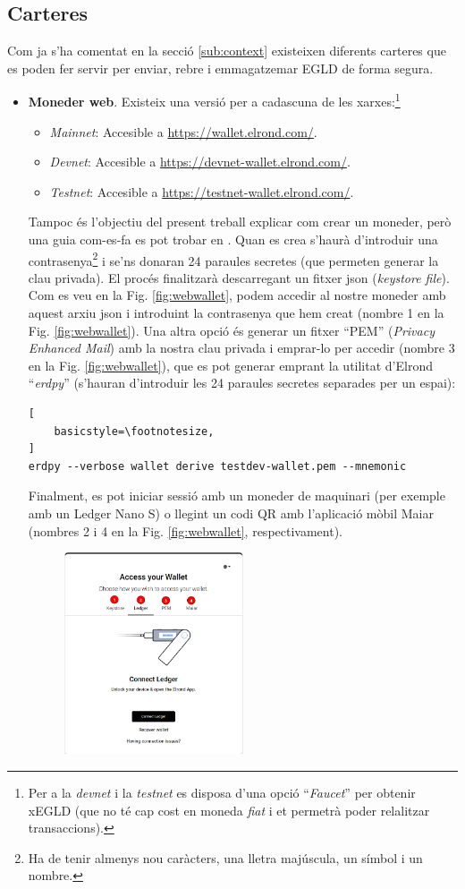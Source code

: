 \documentclass[11pt,a4paper]{article}
\begin{document}
\subsection{Carteres}
Com ja s'ha comentat en la secció \ref{sub:context} existeixen diferents carteres que es poden fer servir per enviar, rebre i emmagatzemar EGLD de forma segura.
\begin{itemize}
\item \textbf{Moneder web}. Existeix una versió per a cadascuna de les xarxes:\footnote{Per a la \textit{devnet} i la \textit{testnet} es disposa d'una opció ``\textit{Faucet}'' per obtenir xEGLD (que no té cap cost en moneda \textit{fiat} i et permetrà poder relalitzar transaccions).}
	\begin{itemize}
	\item \textit{Mainnet}: Accesible a \url{https://wallet.elrond.com/}.
	\item \textit{Devnet}: Accesible a \url{https://devnet-wallet.elrond.com/}.
	\item \textit{Testnet}: Accesible a \url{https://testnet-wallet.elrond.com/}.
	\end{itemize}
Tampoc és l'objectiu del present treball explicar com crear un moneder, però una guia com-es-fa es pot trobar en \cite{elrond2022}. Quan es crea s'haurà d'introduir una contrasenya\footnote{Ha de tenir almenys nou caràcters, una lletra majúscula, un símbol i un nombre.} i se'ns donaran 24 paraules secretes (que permeten generar la clau privada). El procés finalitzarà descarregant un fitxer json (\textit{keystore file}). Com es veu en la Fig. \ref{fig:webwallet}, podem accedir al nostre moneder amb aquest arxiu json i introduint la contrasenya que hem creat (nombre 1 en la Fig. \ref{fig:webwallet}). Una altra opció és generar un fitxer ``PEM'' (\textit{Privacy Enhanced Mail}) amb la nostra clau privada i emprar-lo per accedir (nombre 3 en la Fig. \ref{fig:webwallet}), que es pot generar emprant la utilitat d'Elrond ``\textit{erdpy}'' (s'hauran d'introduir les 24 paraules secretes separades per un espai):
\begin{lstlisting}[
    basicstyle=\footnotesize,
]
erdpy --verbose wallet derive testdev-wallet.pem --mnemonic
\end{lstlisting}
Finalment, es pot iniciar sessió amb un moneder de maquinari (per exemple amb un Ledger Nano S) o llegint un codi QR amb l'aplicació mòbil Maiar (nombres 2 i 4 en la Fig. \ref{fig:webwallet}, respectivament).
\begin{figure}[h]
\includegraphics[width=0.5\textwidth]{webwallet.png}

\end{figure}
\end{itemize}
\end{document}
